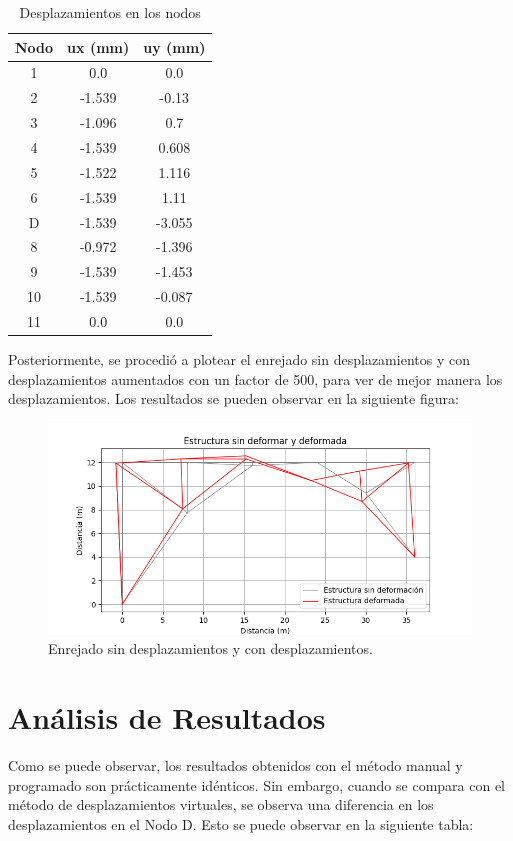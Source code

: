 \documentclass{article}  %
\begin{document}
\begin{table}[h!]
  \centering
  \begin{tabular}{|c|c|c|}
  \hline
  \textbf{Nodo} & \textbf{ux (mm)} & \textbf{uy (mm)} \\
  \hline
  1  & 0.0    & 0.0    \\
  2  & -1.539 & -0.13  \\
  3  & -1.096 & 0.7    \\
  4  & -1.539 & 0.608  \\
  5  & -1.522 & 1.116  \\
  6  & -1.539 & 1.11   \\
  D  & -1.539 & -3.055 \\
  8  & -0.972 & -1.396 \\
  9  & -1.539 & -1.453 \\
  10 & -1.539 & -0.087 \\
  11 & 0.0    & 0.0    \\
  \hline
  \end{tabular}
  \caption{Desplazamientos en los nodos}
\end{table}

\newpage
Posteriormente, se procedió a plotear el enrejado sin desplazamientos y con desplazamientos aumentados con un factor de 500, para ver de mejor manera los desplazamientos. Los resultados se pueden observar en la siguiente figura:
\begin{figure}[h]
  \centering
  \includegraphics[width=1\textwidth]{imagenes/E0_matplotlib.png}
  \caption{Enrejado sin desplazamientos y con desplazamientos.}
  \label{fig:1}
\end{figure}

\newpage
\section{Análisis de Resultados}
Como se puede observar, los resultados obtenidos con el método manual y programado son prácticamente idénticos. Sin embargo, cuando se compara con el método de desplazamientos virtuales, se observa una diferencia en los desplazamientos en el Nodo D. Esto se puede observar en la siguiente tabla:
\end{document}
